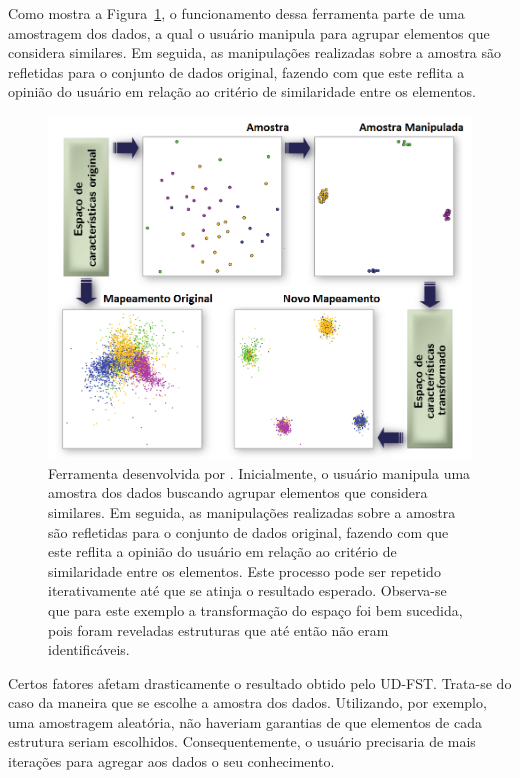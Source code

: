 Como mostra a Figura~\ref{fig:ud}, o funcionamento dessa
ferramenta parte de uma
amostragem dos dados, a qual o usuário manipula
para agrupar elementos que considera similares. Em seguida,
as manipulações realizadas sobre a amostra são refletidas
para o conjunto de dados original, fazendo com que este
reflita a opinião do usuário em relação ao critério de
similaridade entre os elementos.

\begin{figure}[h!]
    \centering
    \includegraphics[width=16cm]{images/ud.png}
    \caption[Ferramenta desenvolvida por \cite{Gladys2013}]
    {Ferramenta desenvolvida por \cite{Gladys2013}.
    Inicialmente, o usuário manipula uma amostra dos dados
    buscando  agrupar elementos que considera similares.
    Em seguida, as manipulações realizadas sobre a
    amostra são refletidas para o conjunto de dados
    original, fazendo com que este reflita a opinião do
    usuário em relação ao critério de similaridade entre
    os elementos. Este processo pode ser repetido
    iterativamente até que se atinja o
    resultado esperado. Observa-se que para este
    exemplo a transformação do espaço foi bem sucedida, pois
    foram reveladas estruturas que até então não eram
    identificáveis.}
    \label{fig:ud}
\end{figure}

Certos fatores afetam drasticamente o resultado obtido
pelo UD-FST. Trata-se do caso da maneira que se
escolhe a amostra dos dados. Utilizando, por exemplo, uma
amostragem aleatória, não haveriam garantias de que
elementos de cada estrutura seriam escolhidos.
Consequentemente, o usuário precisaria de mais iterações
para agregar aos dados o seu conhecimento.

